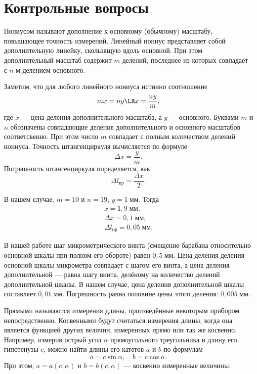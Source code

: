 \section{Контрольные вопросы}

\begin{Enumerate}
	\item Нониусом называют дополнение к основному (обычному) масштабу, повышающее точность измерений. Линейный нониус представляет собой дополнительную линейку, скользящую вдоль основной. При этом дополнительный масштаб содержит $m$ делений, последнее из которых совпадает с $n$-м делением основного.
	
	\item Заметим, что для любого линейного нониуса истинно соотношение
	\[
	mx=ny\LR x=\frac{ny}{m},
	\]
	где $x$ --- цена деления дополнительного масштаба, а $y$ --- основного. Буквами $m$ и $n$ обозначены совпадающие деления дополнительного и основного масштабов соответсвенно. При этом число $m$ совпадает с полным количеством делений нониуса. Точность штангенциркуля вычисляется по формуле
	\[
	\Delta x=\frac{y}{m}.
	\]
	Погрешность штангенциркуля определяется, как
	\[
	\Delta l_\text{пр}=\frac{\Delta x}{2}.
	\]
	
	В нашем случае, $m=10$ и $n=19$, $y=1\;\text{мм}$. Тогда
	\begin{gather*}
	x=1{,}9\;\text{мм}, \\
	\Delta x=0{,}1\;\text{мм}, \\
	\Delta l_\text{пр}=0{,}05\;\text{мм}.
	\end{gather*}
	
	\item В нашей работе шаг микрометрического винта (смещение барабана относительно основной шкалы при полном его обороте) равен $0{,}5\;\text{мм}$. Цена деления деления основной шкалы микрометра совпадает с шагом его винта, а цена деления дополнительной --- равна шагу винта, делёному на количество делений дополнительной шкалы. В нашем случае, цена деления дополнительной шкалы составляет $0{,}01\;\text{мм}$. Погрешность равна половине цены этого деления: $0{,}005\;\text{мм}$.
	
	\item Прямыми называются измерения длины, произведённые некоторым прибором непосредственно. Косвенными будут считаться измерения длины, когда она является функцией других величин, измеренных прямо или так же косвенно. Например, измерив острый угол $\alpha $ прямоугольного треугольника и длину его гипотенузы $c$, можно найти длины его катетов $a$ и $b$ по формулам
	\[
	a=c\sin\alpha,\quad b=c\cos\alpha.
	\]
	При этом, $a=a(c,\alpha)$ и $b=b(c,\alpha)$ --- косвенно измеренные величины.
		

\end{Enumerate}
